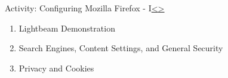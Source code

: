 \documentclass[12pt]{extarticle}
\newenvironment{instructionblock}{\Large\bgroup}{\egroup}
\begin{document}


	
	\pagebreak
	\begin{slide}{Activity: Configuring Mozilla Firefox - I}{\hyperref[slide 11]{\textless}\hyperref[slide 13]{\textgreater}}
		\vskip 5pt
		\begin{instructionblock}
			\begin{enumerate}
				\item Lightbeam Demonstration
				\item Search Engines, Content Settings, and General Security
				\item Privacy and Cookies
			\end{enumerate}
		\end{instructionblock}
	\end{slide}
	\vfill
	
\end{document}
